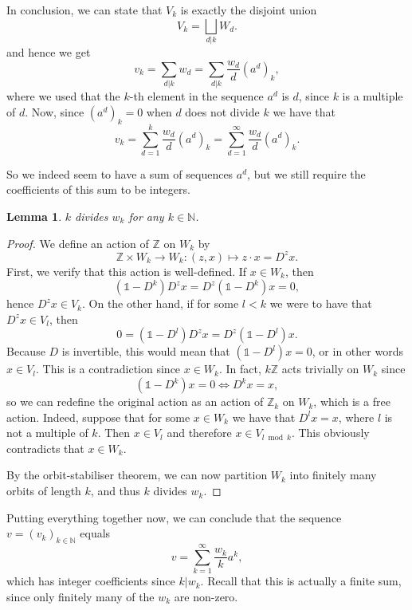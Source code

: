 \documentclass[a4paper]{article}
\theoremstyle{plain}
\newtheorem{lemma}[theorem]{Lemma}
\theoremstyle{definition}
\theoremstyle{remark}
\newcommand{\I}{\mathds{1}}
\newcommand{\NN}{{\mathbb{N}}}
\newcommand{\ZZ}{{\mathbb{Z}}}
\begin{document}
In conclusion, we can state that \(V_k\) is exactly the disjoint union
\begin{equation*}
V_k = \bigsqcup_{d | k} W_d.
\end{equation*}
and hence we get
\begin{equation*}
v_k = \sum_{d|k}w_d = \sum_{d|k} \frac{w_d}{d}(a^d)_k,
\end{equation*}
where we used that the \(k\)-th element in the sequence \(a^d\) is \(d\), since \(k\) is a multiple of \(d\). 
Now, since $(a^d)_k=0$ when $d$
 does not divide $k$ we have that 
\[ v_k = \sum_{d=1}^k \frac{w_d}{d}(a^d)_k= \sum_{d=1}^\infty \frac{w_d}{d}(a^d)_k.\]

 So we indeed seem to have a sum of sequences \(a^d\), but we still require the coefficients of this sum to be integers.

\begin{lemma}
	\label{lem:kdivideswk}
	 \(k\) divides \(w_k\) for any \(k \in \NN\).
\end{lemma}
\begin{proof}
We define an action of \(\ZZ\) on \(W_k\) by
\begin{equation*}
\ZZ \times W_k \to W_k: (z,x) \mapsto z \cdot x = D^z x.
\end{equation*}
First, we verify that this action is well-defined. If \(x \in W_k\), then 
\begin{equation*}
(\I - D^k)D^zx = D^z(\I-D^k)x = 0,
\end{equation*}
hence \(D^zx \in V_k\). On the other hand, if for some \(l < k\) we were to have that \(D^zx  \in V_l\), then 
\begin{equation*}
0 = (\I-D^l)D^zx = D^z(\I-D^l)x.
\end{equation*}
Because \(D\) is invertible, this would mean that \((\I-D^l)x = 0\), or in other words \(x \in V_l\). This is a contradiction since \(x \in W_k\). In fact, \(k\ZZ\) acts trivially on \(W_k\) since 
\begin{equation*}
(\I-D^k)x = 0 \iff D^k x = x,
\end{equation*}
so we can redefine the original action as an action of \(\ZZ_k\) on \(W_k\), which is a free action. Indeed, suppose that for some \(x \in W_k\) we have that \(D^lx = x\), where \(l\) is not a multiple of \(k\). Then \(x \in V_l\) and therefore \(x \in V_{l \bmod k}\). This obviously contradicts that \(x \in W_k\).

By the orbit-stabiliser theorem, we can now partition \(W_k\) into finitely many orbits of length \(k\), and thus \(k\) divides \(w_k\). 
\end{proof}
Putting everything together now, we can conclude that the sequence \(v = (v_k)_{k \in \NN}\) equals
\begin{equation*}
v = \sum_{k=1}^\infty \frac{w_k}{k} a^k,
\end{equation*}
which has integer coefficients since \(k|w_k\). Recall that this is  actually a finite sum, since only finitely many of the \(w_k\) are non-zero.
\end{document}

